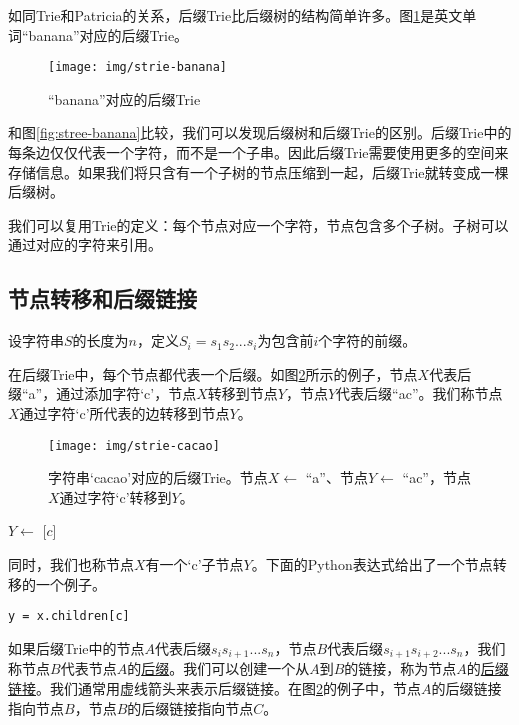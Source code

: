 \documentclass{ctexart}
\begin{document}
如同Trie和Patricia的关系，后缀Trie比后缀树的结构简单许多。图\cref{fig:strie-banana}是英文单词“banana”对应的后缀Trie。

\begin{figure}[htbp]
  \centering
  \texttt{[image: img/strie-banana]}
  \caption{“banana”对应的后缀Trie} \label{fig:strie-banana}
\end{figure}

和图\cref{fig:stree-banana}比较，我们可以发现后缀树和后缀Trie的区别。后缀Trie中的每条边仅仅代表一个字符，而不是一个子串。因此后缀Trie需要使用更多的空间来存储信息。如果我们将只含有一个子树的节点压缩到一起，后缀Trie就转变成一棵后缀树。

我们可以复用Trie的定义：每个节点对应一个字符，节点包含多个子树。子树可以通过对应的字符来引用。

\subsection{节点转移和后缀链接}

设字符串$S$的长度为$n$，定义$S_i=s_1s_2...s_i$为包含前$i$个字符的前缀。

在后缀Trie中，每个节点都代表一个后缀。如图\cref{fig:strie-cacao}所示的例子，节点$X$代表后缀“a”，通过添加字符‘c’，节点$X$转移到节点$Y$，节点$Y$代表后缀“ac”。我们称节点$X$通过字符‘c’所代表的边转移到节点$Y$\cite{ukkonen95}。

\begin{figure}[htbp]
  \centering
  \texttt{[image: img/strie-cacao]}
  \caption{字符串‘cacao’对应的后缀Trie。节点$X \gets$ “a”、节点$Y \gets$ “ac”，节点$X$通过字符‘c’转移到$Y$。}
  \label{fig:strie-cacao}
\end{figure}

\begin{algorithmic}
\State $Y \gets$ [$c$]
\end{algorithmic}

同时，我们也称节点$X$有一个‘c’子节点$Y$。下面的Python表达式给出了一个节点转移的一个例子。

\lstset{language=python}
\begin{lstlisting}
y = x.children[c]
\end{lstlisting}

如果后缀Trie中的节点$A$代表后缀$s_is_{i+1}...s_n$，节点$B$代表后缀$s_{i+1}s_{i+2}...s_n$，我们称节点$B$代表节点$A$的\underline{后缀}。我们可以创建一个从$A$到$B$的链接，称为节点$A$的\underline{后缀链接}\cite{ukkonen95}。我们通常用虚线箭头来表示后缀链接。在图\cref{fig:strie-cacao}的例子中，节点$A$的后缀链接指向节点$B$，节点$B$的后缀链接指向节点$C$。
\end{document}

